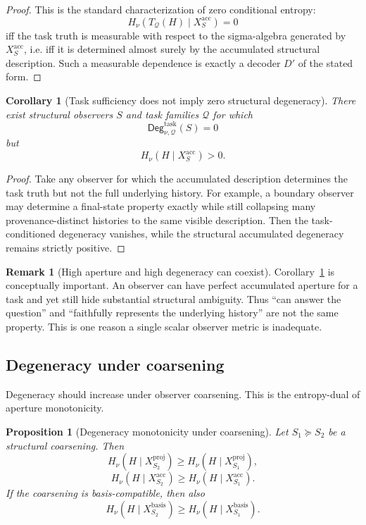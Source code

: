 \documentclass[11pt,twoside]{article}
\newtheorem{proposition}[theorem]{Proposition}
\newtheorem{corollary}[theorem]{Corollary}
\theoremstyle{definition}
\newtheorem{remark}[theorem]{Remark}
\newcommand{\proj}{\mathrm{proj}}
\newcommand{\basis}{\mathrm{basis}}
\newcommand{\acc}{\mathrm{acc}}
\newcommand{\task}{\mathrm{task}}
\begin{document}
\begin{proof}
This is the standard characterization of zero conditional entropy:
\[
  H_\nu(T_{\mathcal{Q}}(H)\mid X_S^{\acc})=0
\]
iff the task truth is measurable with respect to the sigma-algebra generated by \(X_S^{\acc}\), i.e. iff it is determined almost surely by the accumulated structural description. Such a measurable dependence is exactly a decoder \(D'\) of the stated form.
\end{proof}

\begin{corollary}[Task sufficiency does not imply zero structural degeneracy]
\label{cor:task-suff-not-zero-structural-deg}
There exist structural observers \(S\) and task families \(\mathcal{Q}\) for which
\[
  \mathsf{Deg}^{\task}_{\nu,\mathcal{Q}}(S)=0
\]
but
\[
  H_\nu(H\mid X_S^{\acc}) > 0.
\]
\end{corollary}

\begin{proof}
Take any observer for which the accumulated description determines the task truth but not the full underlying history. For example, a boundary observer may determine a final-state property exactly while still collapsing many provenance-distinct histories to the same visible description. Then the task-conditioned degeneracy vanishes, while the structural accumulated degeneracy remains strictly positive.
\end{proof}

\begin{remark}[High aperture and high degeneracy can coexist]
\label{rem:high-aperture-high-deg}
Corollary~\ref{cor:task-suff-not-zero-structural-deg} is conceptually important. An observer can have perfect accumulated aperture for a task and yet still hide substantial structural ambiguity. Thus ``can answer the question'' and ``faithfully represents the underlying history'' are not the same property. This is one reason a single scalar observer metric is inadequate.
\end{remark}

\subsection{Degeneracy under coarsening}
\label{subsec:deg-under-coarsening}

Degeneracy should increase under observer coarsening. This is the entropy-dual of aperture monotonicity.

\begin{proposition}[Degeneracy monotonicity under coarsening]
\label{prop:deg-monotonicity-coarsening}
Let \(S_1 \succeq S_2\) be a structural coarsening. Then
\[
  H_\nu(H\mid X_{S_2}^{\proj})
  \ge
  H_\nu(H\mid X_{S_1}^{\proj}),
\]
\[
  H_\nu(H\mid X_{S_2}^{\acc})
  \ge
  H_\nu(H\mid X_{S_1}^{\acc}).
\]
If the coarsening is basis-compatible, then also
\[
  H_\nu(H\mid X_{S_2}^{\basis})
  \ge
  H_\nu(H\mid X_{S_1}^{\basis}).
\]
\end{proposition}
\end{document}
